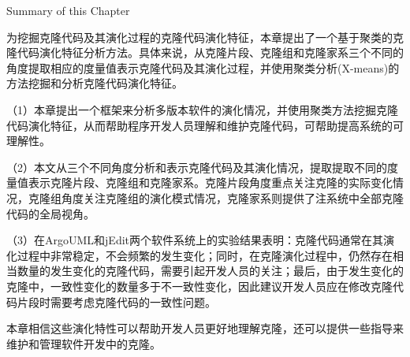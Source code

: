 
\newpage

{Summary of  this Chapter}
 
为挖掘克隆代码及其演化过程的克隆代码演化特征，本章提出了一个基于聚类的克隆代码演化特征分析方法。具体来说，从克隆片段、克隆组和克隆家系三个不同的角度提取相应的度量值表示克隆代码及其演化过程，并使用聚类分析(X-means)的方法挖掘和分析克隆代码演化特征。

（1）本章提出一个框架来分析多版本软件的演化情况，并使用聚类方法挖掘克隆代码演化特征，从而帮助程序开发人员理解和维护克隆代码，可帮助提高系统的可理解性。

（2）本文从三个不同角度分析和表示克隆代码及其演化情况，提取提取不同的度量值表示克隆片段、克隆组和克隆家系。克隆片段角度重点关注克隆的实际变化情况，克隆组角度关注克隆组的演化模式情况，克隆家系则提供了注系统中全部克隆代码的全局视角。

（3）在ArgoUML和jEdit两个软件系统上的实验结果表明：克隆代码通常在其演化过程中非常稳定，不会频繁的发生变化；同时，在克隆演化过程中，仍然存在相当数量的发生变化的克隆代码，需要引起开发人员的关注；最后，由于发生变化的克隆中，一致性变化的数量多于不一致性变化，因此建议开发人员应在修改克隆代码片段时需要考虑克隆代码的一致性问题。

本章相信这些演化特性可以帮助开发人员更好地理解克隆，还可以提供一些指导来维护和管理软件开发中的克隆。


